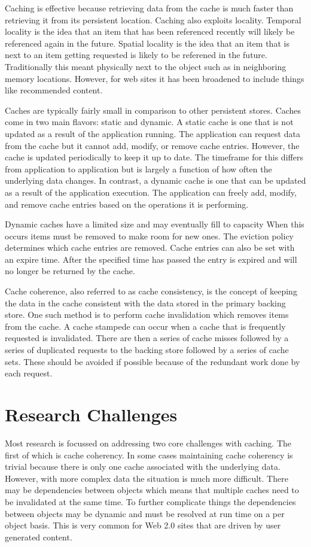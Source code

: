 \documentclass[12pt]{article}
\begin{document}
Caching is effective because retrieving data from the cache is much faster than retrieving it from its persistent location.
Caching also exploits locality.
Temporal locality is the idea that an item that has been referenced recently will likely be referenced again in the future.
Spatial locality is the idea that an item that is next to an item getting requested is likely to be referened in the future.
Traditionally this meant physically next to the object such as in neighboring memory locations.
However, for web sites it has been broadened to include things like recommended content.

Caches are typically fairly small in comparison to other persistent stores.
Caches come in two main flavors: static and dynamic. %
A static cache is one that is not updated as a result of the application running.
The application can request data from the cache but it cannot add, modify, or remove cache entries.
However, the cache is updated periodically to keep it up to date.
The timeframe for this differs from application to application but is largely a function of how often the underlying data changes.
In contrast, a dynamic cache is one that can be updated as a result of the application execution.
The application can freely add, modify, and remove cache entries based on the operations it is performing.

Dynamic caches have a limited size and may eventually fill to capacity
When this occurs items must be removed to make room for new ones.
The eviction policy determines which cache entries are removed.
Cache entries can also be set with an expire time.
After the specified time has passed the entry is expired and will no longer be returned by the cache.

Cache coherence, also referred to as cache consistency, is the concept of keeping the data in the cache consistent with the data stored in the primary backing store.
One such method is to perform cache invalidation which removes items from the cache.
A cache stampede can occur when a cache that is frequently requested is invalidated.
There are then a series of cache misses followed by a series of duplicated requests to the backing store followed by a series of cache sets.
These should be avoided if possible because of the redundant work done by each request.

\section{Research Challenges}
Most research is focussed on addressing two core challenges with caching.
The first of which is cache coherency.
In some cases maintaining cache coherency is trivial because there is only one cache associated with the underlying data.
However, with more complex data the situation is much more difficult.
There may be dependencies between objects which means that multiple caches need to be invalidated at the same time.
To further complicate things the dependencies between objects may be dynamic and must be resolved at run time on a per object basis.
This is very common for Web 2.0 sites that are driven by user generated content.
\end{document}
